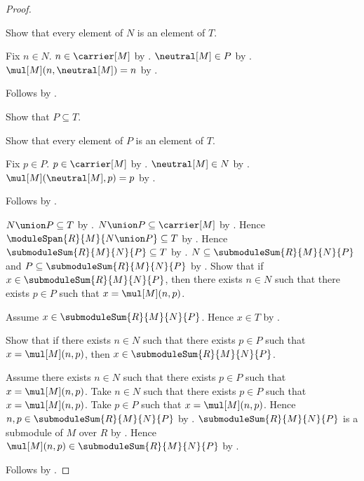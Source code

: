 \begin{proof}
\begin{subproof}
        Show that every element of $N$ is an element of $T$.
        \begin{subproof}
            Fix $n\in N$.
            $n\in\carrier[M]$ by .
            $\neutral[M]\in P$ by .
            $\mul[M](n,\neutral[M])=n$ by
                .
        \end{subproof}
        Follows by .
    \end{subproof}
    Show that $P\subseteq T$.
    \begin{subproof}
        Show that every element of $P$ is an element of $T$.
        \begin{subproof}
            Fix $p\in P$.
            $p\in\carrier[M]$ by .
            $\neutral[M]\in N$ by .
            $\mul[M](\neutral[M],p)=p$ by
                .
        \end{subproof}
        Follows by .
    \end{subproof}
    $N\union P\subseteq T$ by
        .
    $N\union P\subseteq\carrier[M]$ by
        .
    Hence $\moduleSpan{R}{M}{N\union P}\subseteq T$ by
        .
    Hence $\submoduleSum{R}{M}{N}{P}\subseteq T$ by
        .
    $N\subseteq\submoduleSum{R}{M}{N}{P}$ and
        $P\subseteq\submoduleSum{R}{M}{N}{P}$ by
        .
    Show that if $x\in\submoduleSum{R}{M}{N}{P}$, then
        there exists $n\in N$ such that there exists $p\in P$ such that
            $x=\mul[M](n,p)$.
    \begin{subproof}
        Assume $x\in\submoduleSum{R}{M}{N}{P}$.
        Hence $x\in T$ by .
    \end{subproof}
    Show that if there exists $n\in N$ such that
        there exists $p\in P$ such that $x=\mul[M](n,p)$, then
        $x\in\submoduleSum{R}{M}{N}{P}$.
    \begin{subproof}
        Assume there exists $n\in N$ such that
            there exists $p\in P$ such that $x=\mul[M](n,p)$.
        Take $n\in N$ such that there exists $p\in P$ such that
            $x=\mul[M](n,p)$.
        Take $p\in P$ such that $x=\mul[M](n,p)$.
        Hence $n,p\in\submoduleSum{R}{M}{N}{P}$ by .
        $\submoduleSum{R}{M}{N}{P}$ is a submodule of $M$ over $R$ by
            .
        Hence $\mul[M](n,p)\in\submoduleSum{R}{M}{N}{P}$ by
            .
    \end{subproof}
    Follows by \auto.
\end{proof}

